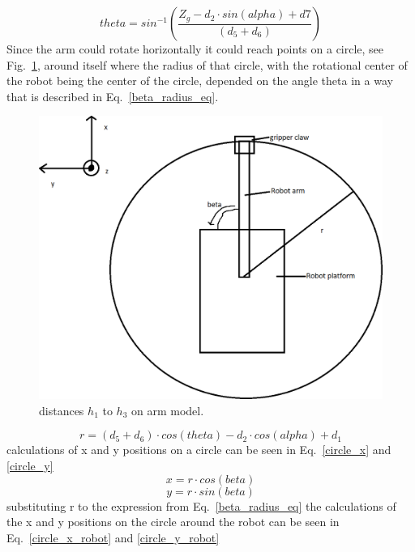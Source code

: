 \begin{equation}
    theta = sin^{-1}(\frac{Z_g - d_2 \cdot sin(alpha) + d7}{(d_5 + d_6)})
    \label{inv_theta_calc_5}
\end{equation}
Since the arm could rotate horizontally it could reach points on a circle, see Fig.~\ref{inv_beta_radius_img}, around itself where the radius of that circle, with the rotational center of the robot being the center of the circle, depended on the angle theta in a way that is described in Eq.~\eqref{beta_radius_eq}.
\begin{figure}[h]
    \centering
    \includegraphics[width=\linewidth]{sections/assets/inv_beta_radius.png}
    \caption{distances \(h_1\) to \(h_3\) on arm model.}
    \label{inv_beta_radius_img}
\end{figure}
\begin{equation}
    r = (d_5 + d_6)\cdot cos(theta) - d_2\cdot cos(alpha) + d_1
    \label{beta_radius_eq}
\end{equation}
calculations of x and y positions on a circle can be seen in Eq.~\eqref{circle_x} and \eqref{circle_y}
\begin{equation}
    x = r\cdot cos(beta)
    \label{circle_x}
\end{equation}
\begin{equation}
    y = r\cdot sin(beta)
    \label{circle_y}
\end{equation}
substituting r to the expression from Eq.~\eqref{beta_radius_eq} the calculations of the x and y positions on the circle around the robot can be seen in Eq.~\eqref{circle_x_robot} and \ref{circle_y_robot}
